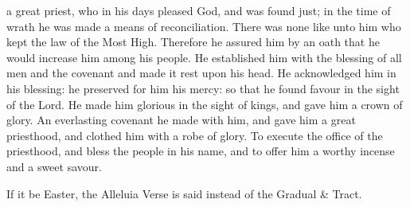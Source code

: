  a great priest, who in his days pleased God, and was found just; in the time of wrath he was made a means of reconciliation. There was none like unto him who kept the law of the Most High. Therefore he assured him by an oath that he would increase him among his people. He established him with the blessing of all men and the covenant and made it rest upon his head. He acknowledged him in his blessing: he preserved for him his mercy: so that he found favour in the sight of the Lord. He made him glorious in the sight of kings, and gave him a crown of glory. An everlasting covenant he made with him, and gave him a great priesthood, and clothed him with a robe of glory. To execute the office of the priesthood, and bless the people in his name, and to offer him a worthy incense and a sweet savour.


\begin{rubric}
    If it be Easter, the Alleluia Verse is said instead of the Gradual \& Tract.
\end{rubric}


